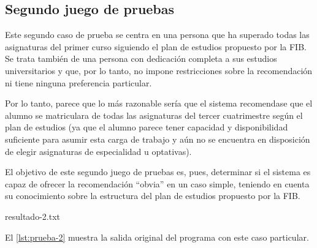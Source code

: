 
\subsection{Segundo juego de pruebas} \label{sec:prueba-2}

Este segundo caso de prueba se centra en una persona que ha superado todas 
las asignaturas del primer curso siguiendo el plan de estudios propuesto por 
la FIB. Se trata también de una persona con dedicación completa a sus estudios
universitarios y que, por lo tanto, no impone restricciones sobre la 
recomendación ni tiene ninguna preferencia particular.

Por lo tanto, parece que lo más razonable sería que el sistema recomendase 
que el alumno se matriculara de todas las asignaturas del tercer cuatrimestre 
según el plan de estudios (ya que el alumno parece tener capacidad y 
disponibilidad suficiente para asumir esta carga de trabajo y aún no se 
encuentra en disposición de elegir asignaturas de especialidad u optativas).

El objetivo de este segundo juego de pruebas es, pues, determinar si el 
sistema es capaz de ofrecer la recomendación ``obvia'' en un caso simple, 
teniendo en cuenta su conocimiento sobre la estructura del plan de estudios 
propuesto por la FIB.

%
    {resultado-2.txt}

El \autoref{lst:prueba-2} muestra la salida original del programa con este 
caso particular.



